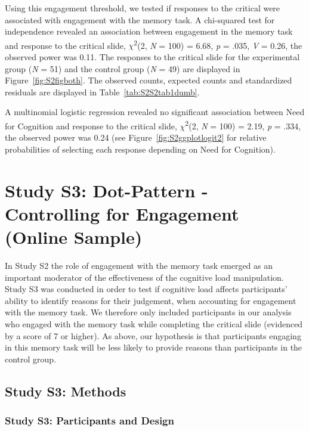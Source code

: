 \documentclass[
  man,floatsintext]{apa6}
\begin{document}
Using this engagement threshold, we tested if responses to the critical were associated with engagement with the memory task. A chi-squared test for independence revealed an association between engagement in the memory task and response to the critical slide, \(\chi\)\textsuperscript{2}(2, \emph{N} = 100) = 6.68, \emph{p} = .035, \emph{V} = 0.26, the observed power was 0.11. The responses to the critical slide for the experimental group (\emph{N} = 51) and the control group (\emph{N} = 49) are displayed in Figure~\ref{fig:S2figboth}. The observed counts, expected counts and standardized residuals are displayed in Table~\ref{tab:S2S2tab1dumb}.

A multinomial logistic regression revealed no significant association between Need for Cognition and response to the critical slide, \(\chi\)\textsuperscript{2}(2, \emph{N} = 100) = 2.19, \emph{p} = .334, the observed power was 0.24 (see Figure~\ref{fig:S2ggplotlogit2} for relative probabilities of selecting each response depending on Need for Cognition).

\newpage

\hypertarget{study-s3-dot-pattern---controlling-for-engagement-online-sample}{%
\section{Study S3: Dot-Pattern - Controlling for Engagement (Online Sample)}\label{study-s3-dot-pattern---controlling-for-engagement-online-sample}}

In Study S2 the role of engagement with the memory task emerged as an important moderator of the effectiveness of the cognitive load manipulation. Study S3 was conducted in order to test if cognitive load affects participants' ability to identify reasons for their judgement, when accounting for engagement with the memory task. We therefore only included participants in our analysis who engaged with the memory task while completing the critical slide (evidenced by a score of 7 or higher). As above, our hypothesis is that participants engaging in this memory task will be less likely to provide reasons than participants in the control group.

\hypertarget{study-s3-methods}{%
\subsection{Study S3: Methods}\label{study-s3-methods}}

\hypertarget{study-s3-participants-and-design}{%
\subsubsection{Study S3: Participants and Design}\label{study-s3-participants-and-design}}
\end{document}
